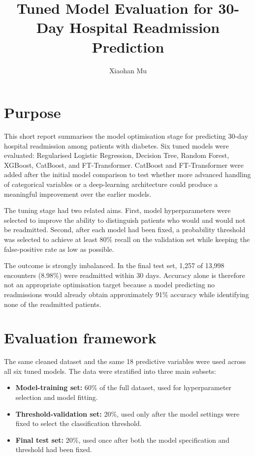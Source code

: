 \documentclass[11pt,a4paper]{article}
\title{Tuned Model Evaluation for 30-Day Hospital Readmission Prediction}
\author{Xiaohan Mu}
\date{}
\begin{document}
\maketitle

\section{Purpose}

This short report summarises the model optimisation stage for predicting 30-day hospital readmission among patients with diabetes. Six tuned models were evaluated: Regularised Logistic Regression, Decision Tree, Random Forest, XGBoost, CatBoost, and FT-Transformer. CatBoost and FT-Transformer were added after the initial model comparison to test whether more advanced handling of categorical variables or a deep-learning architecture could produce a meaningful improvement over the earlier models.

The tuning stage had two related aims. First, model hyperparameters were selected to improve the ability to distinguish patients who would and would not be readmitted. Second, after each model had been fixed, a probability threshold was selected to achieve at least 80\% recall on the validation set while keeping the false-positive rate as low as possible.

The outcome is strongly imbalanced. In the final test set, 1,257 of 13,998 encounters (8.98\%) were readmitted within 30 days. Accuracy alone is therefore not an appropriate optimisation target because a model predicting no readmissions would already obtain approximately 91\% accuracy while identifying none of the readmitted patients.

\section{Evaluation framework}

The same cleaned dataset and the same 18 predictive variables were used across all six tuned models. The data were stratified into three main subsets:

\begin{itemize}
    \item \textbf{Model-training set:} 60\% of the full dataset, used for hyperparameter selection and model fitting.
    \item \textbf{Threshold-validation set:} 20\%, used only after the model settings were fixed to select the classification threshold.
    \item \textbf{Final test set:} 20\%, used once after both the model specification and threshold had been fixed.
\end{itemize}
\end{document}
